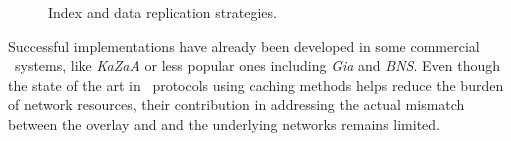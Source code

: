 \begin{figure}[ht]
\centering
{}\qquad\qquad
{}
\caption{Index and data replication strategies.}
\label{figure:replication}
\end{figure}
Successful implementations have
already been developed in some commercial \p\ systems, like 
\emph{KaZaA} or less popular ones including \emph{Gia} and \emph{BNS}.
Even though the state of the art in \p\ protocols using caching methods
helps reduce the burden of network resources, 
their contribution in addressing the actual mismatch between the overlay and
and the underlying networks remains limited.

